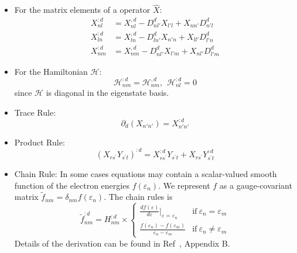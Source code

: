 \documentclass[prx,amsmath,amssymb,superscriptaddress,longbibliography]{revtex4-2}
\begin{document}
\begin{itemize}
    \item For the matrix elements of a operator $\hat{X}$:
         \begin{align}
            X_{nl}^{:d} &=  X_{nl}^{,d} - D_{nl'}^d X_{l'l} + X_{nn'}D_{n'l}^d  \\
            X_{ln}^{:d} &=  X_{ln}^{,d} - D_{ln'}^d X_{n'n} + X_{ll'}D_{l'n}^d  \\
            X_{nm}^{:d} &=  X_{nm}^{,d} - D_{nl'}^d X_{l'm} + X_{nl'}D_{l'm}^d 
        \end{align}
    \item For the Hamiltonian $\mathcal{H}$:
        \begin{equation}
            \mathcal{H}_{nm}^{:d} = \mathcal{H}_{nm}^{,d}, \hspace{5pt} \mathcal{H}_{nl}^{:d} =0
        \end{equation}
        since $\mathcal{H}$ is diagonal in the eigenstate basis.
    \item Trace Rule:
        \begin{equation}
            \partial_d ( X_{n'n'} ) = X_{n'n'}^{:d}
        \end{equation}
    \item Product Rule:
        \begin{equation}
            \left(X_{rs^{\prime}}Y_{s^{\prime}t}\right)^{:d}=X_{rs^{\prime}}^{:d}Y_{s^{\prime}t}+X_{rs^{\prime}}Y_{s^{\prime}t}^{:d}
        \end{equation}
    \item Chain Rule: In some cases equations may contain a scalar-valued smooth function of the electron energies $f(\varepsilon_n)$. We represent $f$ as a gauge-covariant matrix $\widetilde{f}_{nm} = \delta_{nm}f(\varepsilon_n)$. The chain rules is 
        \begin{equation}
            \widetilde{f}_{nm}^{:d}=H_{nm}^{:d}\times
            \begin{cases}
            \frac{df\left(\varepsilon\right)}{d\varepsilon} |_{\varepsilon = \varepsilon_n} & \mathrm{if}\ \varepsilon_{n}=\varepsilon_{m}\\
            \frac{f\left(\varepsilon_{n}\right)-f\left(\varepsilon_{m}\right)}{\varepsilon_{n}-\varepsilon_{m}} & \mathrm{if}\ \varepsilon_{n}\neq\varepsilon_{m}
            \end{cases}
        \end{equation}
        Details of the derivation can be found in Ref~\cite{Liu2023CovariantderivativesBerry}, Appendix B.
\end{itemize}








\end{document}
